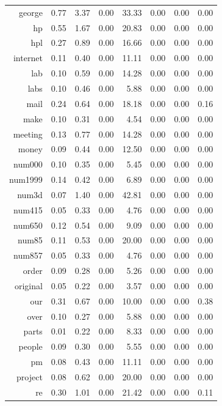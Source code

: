 \documentclass{article}\usepackage[]{graphicx}\usepackage[]{xcolor}
\begin{document}
\begin{table}[ht]
\begin{tabular}{rrrrrrrr}
  george & 0.77 & 3.37 & 0.00 & 33.33 & 0.00 & 0.00 & 0.00 \\ 
  hp & 0.55 & 1.67 & 0.00 & 20.83 & 0.00 & 0.00 & 0.00 \\ 
  hpl & 0.27 & 0.89 & 0.00 & 16.66 & 0.00 & 0.00 & 0.00 \\ 
  internet & 0.11 & 0.40 & 0.00 & 11.11 & 0.00 & 0.00 & 0.00 \\ 
  lab & 0.10 & 0.59 & 0.00 & 14.28 & 0.00 & 0.00 & 0.00 \\ 
  labs & 0.10 & 0.46 & 0.00 & 5.88 & 0.00 & 0.00 & 0.00 \\ 
  mail & 0.24 & 0.64 & 0.00 & 18.18 & 0.00 & 0.00 & 0.16 \\ 
  make & 0.10 & 0.31 & 0.00 & 4.54 & 0.00 & 0.00 & 0.00 \\ 
  meeting & 0.13 & 0.77 & 0.00 & 14.28 & 0.00 & 0.00 & 0.00 \\ 
  money & 0.09 & 0.44 & 0.00 & 12.50 & 0.00 & 0.00 & 0.00 \\ 
  num000 & 0.10 & 0.35 & 0.00 & 5.45 & 0.00 & 0.00 & 0.00 \\ 
  num1999 & 0.14 & 0.42 & 0.00 & 6.89 & 0.00 & 0.00 & 0.00 \\ 
  num3d & 0.07 & 1.40 & 0.00 & 42.81 & 0.00 & 0.00 & 0.00 \\ 
  num415 & 0.05 & 0.33 & 0.00 & 4.76 & 0.00 & 0.00 & 0.00 \\ 
  num650 & 0.12 & 0.54 & 0.00 & 9.09 & 0.00 & 0.00 & 0.00 \\ 
  num85 & 0.11 & 0.53 & 0.00 & 20.00 & 0.00 & 0.00 & 0.00 \\ 
  num857 & 0.05 & 0.33 & 0.00 & 4.76 & 0.00 & 0.00 & 0.00 \\ 
  order & 0.09 & 0.28 & 0.00 & 5.26 & 0.00 & 0.00 & 0.00 \\ 
  original & 0.05 & 0.22 & 0.00 & 3.57 & 0.00 & 0.00 & 0.00 \\ 
  our & 0.31 & 0.67 & 0.00 & 10.00 & 0.00 & 0.00 & 0.38 \\ 
  over & 0.10 & 0.27 & 0.00 & 5.88 & 0.00 & 0.00 & 0.00 \\ 
  parts & 0.01 & 0.22 & 0.00 & 8.33 & 0.00 & 0.00 & 0.00 \\ 
  people & 0.09 & 0.30 & 0.00 & 5.55 & 0.00 & 0.00 & 0.00 \\ 
  pm & 0.08 & 0.43 & 0.00 & 11.11 & 0.00 & 0.00 & 0.00 \\ 
  project & 0.08 & 0.62 & 0.00 & 20.00 & 0.00 & 0.00 & 0.00 \\ 
  re & 0.30 & 1.01 & 0.00 & 21.42 & 0.00 & 0.00 & 0.11 \\ 

\end{tabular}
\end{table}
\end{document}
